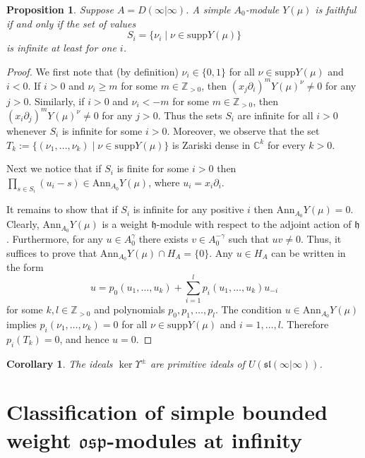 \documentclass[12pt]{amsart}
\theoremstyle{plain} %
\numberwithin{equation}{section}
\theoremstyle{definition}
\theoremstyle{remark}
\theoremstyle{plain} %
\newtheorem{corollary}[definition]{Corollary}
\newtheorem{proposition}[definition]{Proposition}
\newcommand{\osp}{\mathfrak{osp}}
\newcommand{\Ann}{\mathrm{Ann}}
\newcommand{\supp}{\mathrm{supp}}
\newcommand{\C}{\mathbb{C}}
\newcommand{\gh}{\mathfrak{h}}
\def\gh{\mathfrak{h}}
\begin{document}
      \begin{proposition}\label{faithful} Suppose $A=D(\infty|\infty)$. A simple $A_0$-module $Y(\mu)$ is faithful if and only if the set of values $$S_i=\{\nu_i\mid \nu\in \supp Y(\mu)\}$$ is infinite 
        at least for one $i$.
        \end{proposition}
        \begin{proof} We first note that (by definition) $\nu_i\in\{0,1\}$ for all $\nu\in \supp Y(\mu)$ and $i<0$. If $i>0$ and $\nu_i\geq m$ for some $m\in \mathbb Z_{>0}$, then $(x_j\partial_i)^mY(\mu)^{\nu}\neq 0$ for any $j>0$.
          Similarly, if $i>0$ and $\nu_i<-m$ for some  $m\in \mathbb Z_{>0}$, then $(x_i\partial_j)^mY(\mu)^{\nu}\neq 0$ for any $j>0$. Thus the sets $S_i$ are infinite for all $i>0$ whenever $S_i$ is infinite for some $i>0$.
                    Moreover, we observe that the set $T_k:=\{(\nu_1,\dots,\nu_k)\mid\nu\in\supp Y(\mu)\}$ is Zariski dense in $\C^k$ for every $k>0$.

          Next we notice that if $S_i$ is finite for some $i>0$ then $\prod_{s\in S_i}(u_i-s)\in\Ann_{A_0}Y(\mu)$, where $u_i=x_i\partial_i$.

          It remains to show that if $S_i$ is infinite for any positive $i$ then $\Ann_{A_0}Y(\mu)=0$. Clearly, $\Ann_{A_0}Y(\mu)$ is a weight $\gh$-module with respect to the adjoint action of $\gh$. Furthermore, for any
          $u\in A_0^{\gamma}$ there exists $v\in A_0^{-\gamma}$ such that $uv\neq 0$. Thus, it suffices to prove that $\Ann_{A_0}Y(\mu)\cap H_A=\{0\}$. Any $u\in H_A$ can be written in the form
          $$u=p_0(u_1,\dots,u_k)+\sum_{i=1}^lp_i(u_1,\dots,u_k)u_{-i}$$
          for some $k,l \in \mathbb Z_{>0}$ and polynomials $p_0,p_1,\dots,p_l$. The condition $u\in \Ann_{A_0}Y(\mu)$ implies
          $p_i(\nu_1,\dots,\nu_k)=0$ for all $\nu\in\supp Y(\mu)$ and $i=1,\dots,l$. Therefore $p_i(T_k)=0$, and hence $u=0$.
          \end{proof}
   
      \begin{corollary}\label{primcor} The ideals $\ker\Upsilon^\pm$ are primitive ideals of $U(\mathfrak{sl}(\infty|\infty))$.
          \end{corollary}

 
\section{Classification of simple bounded weight $\osp$-modules at infinity}
\end{document}

